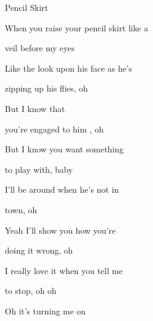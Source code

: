\begin{song}{Pencil Skirt}{
	
	\chordset[Verse]{ \CMaj \AMaj \DMaj \GMaj }
	\chordset[Chorus]{ \EmShAm \CMajShE \DMajShA \GMajShE}
	\vspace{1em}
}


\begin{songverse}


\hspace{30pt}When you raise your pencil skirt like a 

veil before my eyes 

 Like the look upon his face as he's

 
 zipping up his flies, oh


 But I know that


 you're engaged to him  , oh


\hspace{10pt}But I  know you want something 


to play with, baby

\end{songverse}

\begin{songchorus}

 I'll be around when he's not in 
 
 town, oh 


 Yeah I'll show you how you're 
 
 doing it wrong, oh 


 I really love it when you tell me 
 
 to stop, oh oh 
                
 
 Oh it's turning me on

\end{songchorus}

\begin{songverse}


\end{songverse}
\end{song}
